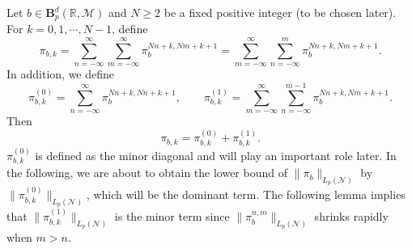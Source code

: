 \documentclass[oneside,english,a4wide]{amsart}
\numberwithin{equation}{section}
\numberwithin{figure}{section}
\theoremstyle{plain}
\theoremstyle{plain}
\theoremstyle{definition}
\theoremstyle{plain}
\theoremstyle{remark}
\theoremstyle{definition}
\theoremstyle{remark}
\theoremstyle{definition}
\newcommand{\M}{{\mathcal M}}
\newcommand{\8}{\infty}
\begin{document}
Let $b\in \pmb{B}^d_p(\mathbb{R},\M)$ and $N\ge 2$ be a fixed positive integer (to be chosen later). For $k=0,1,\cdots, N-1$, define
\begin{equation}\label{pibk}
	\pi_{b,k}=\sum_{n=-\infty}^{\infty}\sum_{m=-\infty}^{\infty}\pi_b^{Nn+k,Nm+k+1}=\sum_{m=-\infty}^{\infty}\sum_{n=-\infty}^{m}\pi_b^{Nn+k,Nm+k+1}.
\end{equation}
In addition, we define
\begin{equation*}\label{pibk0}
	\pi_{b,k}^{(0)}=\sum_{n=-\infty}^{\infty}\pi_b^{Nn+k,Nn+k+1},\quad\quad \pi_{b,k}^{(1)}=\sum_{m=-\infty}^{\infty}\sum_{n=-\infty}^{m-1}\pi_b^{Nn+k,Nm+k+1}.
\end{equation*}
Then
\begin{equation*}\label{pibksum}
	\pi_{b,k}=\pi_{b,k}^{(0)}+\pi_{b,k}^{(1)}.
\end{equation*}
$\pi_{b, k}^{(0)}$ is defined as the minor diagonal and will play an important role later. In the following, we are about to obtain the lower bound of $\|\pi_b\|_{L_p(\mathcal{N})}$ by $\|\pi_{b, k}^{(0)}\|_{L_p(\mathcal{N})}$, which will be the dominant term. The following lemma implies that $\|\pi_{b,k}^{(1)}\|_{L_p(\mathcal{N})}$ is the minor term  since $	\|\pi_b^{n,m}\|_{L_p(\mathcal{N})}$ shrinks rapidly when $m>n$.
\end{document}

